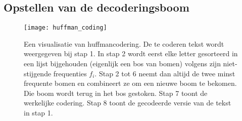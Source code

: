 \subsection{Opstellen van de decoderingsboom}
\begin{figure}[ht]
    \centering
    \texttt{[image: huffman\_coding]}
    \caption{Een visualisatie van huffmancodering. De te coderen tekst wordt weergegeven bij stap 1. 
    In stap 2 wordt eerst elke letter gesorteerd in een lijst bijgehouden (eigenlijk een bos van bomen) volgens zijn niet-stijgende frequenties $f_i$. Stap 2 tot 6 neemt dan altijd de twee minst frequente bomen en combineert ze om een nieuwe boom te bekomen. Die boom wordt terug in het bos gestoken. Stap 7 toont de werkelijke codering. Stap 8 toont de gecodeerde versie van de tekst in stap 1.}
    \label{fig:huffman_coding}
\end{figure}

